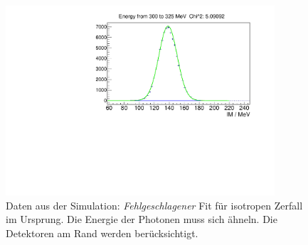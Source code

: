 \documentclass[a4paper,11pt,oneside,final,german,openbib,pdftex]{scrbook}
\begin{document}
{\begin{appendix}

\begin{figure}[h!]
	\begin{center}
		\includegraphics[width=100mm]{20172804IsotropUrsprungFitFail}
		\end{center}
	\caption[Simulation: Fehlgeschlagener Fit Isotrop Urspung]{Daten aus der Simulation: \textit{Fehlgeschlagener} Fit f\"ur isotropen Zerfall im Ursprung. Die Energie der Photonen muss sich \"ahneln. Die Detektoren am Rand werden ber\"ucksichtigt.}
	\label{fig:Isotrop-Fit-Fail}
\end{figure}




\end{appendix}}
\end{document}
